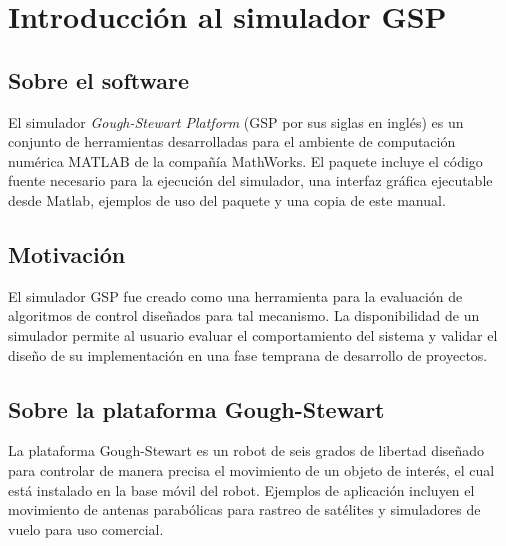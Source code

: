 \chapter{Introducción al simulador GSP}

\section{Sobre el software}
El simulador \emph{Gough-Stewart Platform} (GSP por sus siglas en inglés) es un 
conjunto de herramientas desarrolladas para el ambiente de computación numérica 
MATLAB  de la compañía MathWorks. El paquete incluye el código fuente necesario 
para la ejecución del simulador, una interfaz gráfica ejecutable desde Matlab, 
ejemplos de uso del paquete y una copia de este manual.

\section{Motivación}
El simulador GSP fue creado como una herramienta para la evaluación de 
algoritmos de control diseñados para tal mecanismo. La disponibilidad de un 
simulador permite al usuario evaluar el comportamiento del sistema y validar el 
diseño de su implementación en una fase temprana de desarrollo de proyectos.

\section{Sobre la plataforma Gough-Stewart}

La plataforma Gough-Stewart es un robot de seis grados de libertad diseñado para 
controlar de manera precisa el movimiento de un objeto de interés, el cual está 
instalado en la base móvil del robot. Ejemplos de aplicación incluyen el 
movimiento de antenas parabólicas para rastreo de satélites y
simuladores de vuelo para uso comercial.


